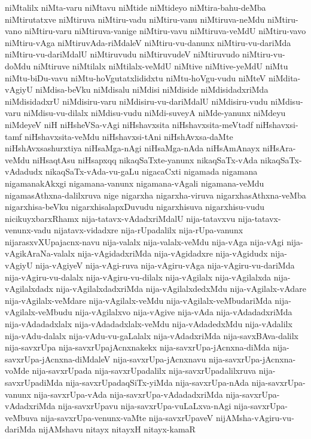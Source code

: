 {niMtalilx
niMta-varu
niMtavu
niMtide
niMtideyo
niMtira-bahu-deMba
niMtirutatxve
niMtiruva
niMtiru-vadu
niMtiru-vanu
niMtiruva-neMdu
niMtiru-vano
niMtiru-varu
niMtiruva-vanige
niMtiru-vavu
niMtiruva-veMdU
niMtiru-vavo
niMtiru-vAga
niMtiruvAda-riMdaleV
niMtiru-vu-danunx
niMtiru-vu-dariMda
niMtiru-vu-dariMdalU
niMtiruvudu
niMtiruvudeV
niMtiruvudo
niMtiru-vu-doMdu
niMtiruve
niMtilalx
niMtilalx-veMdU
niMtive
niMtive-yeMdU
niMtu
niMtu-biDu-vavu
niMtu-hoVgutatxlididxtu
niMtu-hoVgu-vudu
niMteV
niMdita-vAgiyU
niMdisa-beVku
niMdisalu
niMdisi
niMdiside
niMdisidadxriMda
niMdisidadxrU
niMdisiru-varu
niMdisiru-vu-dariMdalU
niMdisiru-vudu
niMdisu-varu
niMdisu-vu-dilalx
niMdisu-vudu
niMdi-suveyA
niMde-yanunx
niMdeyu
niMdeyeV
niH
niHsheVSa-vAgi
niHshavxsita
niHshavxsita-meVtadf
niHshavxsi-tamf
niHshavxsita-veMdu
niHshavxsi-tAni
niHshAvxsa-daMte
niHshAvxsashurxtiya
niHsaMga-nAgi
niHsaMga-nAda
niHsAmAnayx
niHsAra-veMdu
niHsaqtAsu
niHsapxqq
nikaqSaTxte-yanunx
nikaqSaTx-vAda
nikaqSaTx-vAdadudx
nikaqSaTx-vAda-vu-gaLu
nigacaCxti
nigamada
nigamana
nigamanakAkxgi
nigamana-vanunx
nigamana-vAgali
nigamana-veMdu
nigamasAthxna-dalilxruva
nige
nigarxha
nigarxha-viruva
nigarxhasAthxna-veMba
nigarxhisa-beVku
nigarxhisalapxDuvudu
nigarxhisuva
nigarxhisu-vudu
nicikuyxbarxRhamx
nija-tatavx-vAdadxriMdalU
nija-tatavxvu
nija-tatavx-venunx-vadu
nijatavx-vidadxre
nija-rUpadalilx
nija-rUpa-vanunx
nijarasxvXUpajacnx-navu
nija-valalx
nija-valalx-veMdu
nija-vAga
nija-vAgi
nija-vAgikAraNa-valalx
nija-vAgidadxriMda
nija-vAgidadxre
nija-vAgidudx
nija-vAgiyU
nija-vAgiyeV
nija-vAgi-ruva
nija-vAgiru-vAga
nija-vAgiru-vu-dariMda
nija-vAgiru-vu-dalalx
nija-vAgiru-vu-dilalx
nija-vAgilalx
nija-vAgilalxda
nija-vAgilalxdadx
nija-vAgilalxdadxriMda
nija-vAgilalxdedxMdu
nija-vAgilalx-vAdare
nija-vAgilalx-veMdare
nija-vAgilalx-veMdu
nija-vAgilalx-veMbudariMda
nija-vAgilalx-veMbudu
nija-vAgilalxvo
nija-vAgive
nija-vAda
nija-vAdadadxriMda
nija-vAdadadxlalx
nija-vAdadadxlalx-veMdu
nija-vAdadedxMdu
nija-vAdalilx
nija-vAdu-dalalx
nija-vAdu-vu-gaLalalx
nija-vAdadxriMda
nija-savxBAva-dalilx
nija-savxrUpa
nija-savxrUpajAcnxnakekx
nija-savxrUpa-jAcnxna-diMda
nija-savxrUpa-jAcnxna-diMdaleV
nija-savxrUpa-jAcnxnavu
nija-savxrUpa-jAcnxna-voMde
nija-savxrUpada
nija-savxrUpadalilx
nija-savxrUpadalilxruva
nija-savxrUpadiMda
nija-savxrUpadaqSiTx-yiMda
nija-savxrUpa-nAda
nija-savxrUpa-vanunx
nija-savxrUpa-vAda
nija-savxrUpa-vAdadadxriMda
nija-savxrUpa-vAdadxriMda
nija-savxrUpavu
nija-savxrUpa-vuLaLxva-nAgi
nija-savxrUpa-veMbuva
nija-savxrUpa-venunx-vaMte
nija-savxrUpaveV
nijAMsha-vAgiru-vu-dariMda
nijAMshavu
nitayx
nitayxH
nitayx-kamaR
}
